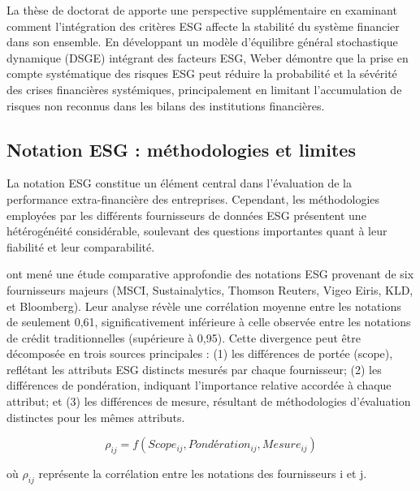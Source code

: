 La thèse de doctorat de \citet{weber2018} apporte une perspective supplémentaire en examinant comment l'intégration des critères ESG affecte la stabilité du système financier dans son ensemble. En développant un modèle d'équilibre général stochastique dynamique (DSGE) intégrant des facteurs ESG, Weber démontre que la prise en compte systématique des risques ESG peut réduire la probabilité et la sévérité des crises financières systémiques, principalement en limitant l'accumulation de risques non reconnus dans les bilans des institutions financières.

\subsection{Notation ESG : méthodologies et limites}

La notation ESG constitue un élément central dans l'évaluation de la performance extra-financière des entreprises. Cependant, les méthodologies employées par les différents fournisseurs de données ESG présentent une hétérogénéité considérable, soulevant des questions importantes quant à leur fiabilité et leur comparabilité.

\citet{berg2020} ont mené une étude comparative approfondie des notations ESG provenant de six fournisseurs majeurs (MSCI, Sustainalytics, Thomson Reuters, Vigeo Eiris, KLD, et Bloomberg). Leur analyse révèle une corrélation moyenne entre les notations de seulement 0,61, significativement inférieure à celle observée entre les notations de crédit traditionnelles (supérieure à 0,95). Cette divergence peut être décomposée en trois sources principales : (1) les différences de portée (scope), reflétant les attributs ESG distincts mesurés par chaque fournisseur; (2) les différences de pondération, indiquant l'importance relative accordée à chaque attribut; et (3) les différences de mesure, résultant de méthodologies d'évaluation distinctes pour les mêmes attributs.

\begin{equation}
\rho_{ij} = f(Scope_{ij}, Pondération_{ij}, Mesure_{ij})
\end{equation}

où $\rho_{ij}$ représente la corrélation entre les notations des fournisseurs i et j.